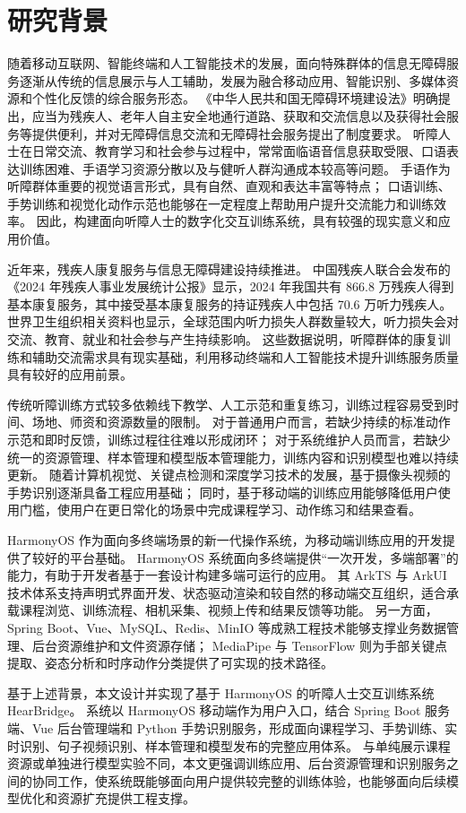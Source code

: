 
\section{研究背景}

随着移动互联网、智能终端和人工智能技术的发展，面向特殊群体的信息无障碍服务逐渐从传统的信息展示与人工辅助，发展为融合移动应用、智能识别、多媒体资源和个性化反馈的综合服务形态。
《中华人民共和国无障碍环境建设法》明确提出，应当为残疾人、老年人自主安全地通行道路、获取和交流信息以及获得社会服务等提供便利，并对无障碍信息交流和无障碍社会服务提出了制度要求\cite{accessibility-law-2023}。
听障人士在日常交流、教育学习和社会参与过程中，常常面临语音信息获取受限、口语表达训练困难、手语学习资源分散以及与健听人群沟通成本较高等问题。
手语作为听障群体重要的视觉语言形式，具有自然、直观和表达丰富等特点；
口语训练、手势训练和视觉化动作示范也能够在一定程度上帮助用户提升交流能力和训练效率。
因此，构建面向听障人士的数字化交互训练系统，具有较强的现实意义和应用价值。

近年来，残疾人康复服务与信息无障碍建设持续推进。
中国残疾人联合会发布的《2024 年残疾人事业发展统计公报》显示，2024 年我国共有 866.8 万残疾人得到基本康复服务，其中接受基本康复服务的持证残疾人中包括 70.6 万听力残疾人\cite{cdpf-statistical-communique-2024}。
世界卫生组织相关资料也显示，全球范围内听力损失人群数量较大，听力损失会对交流、教育、就业和社会参与产生持续影响\cite{who-hearing-loss-2026}。
这些数据说明，听障群体的康复训练和辅助交流需求具有现实基础，利用移动终端和人工智能技术提升训练服务质量具有较好的应用前景。

传统听障训练方式较多依赖线下教学、人工示范和重复练习，训练过程容易受到时间、场地、师资和资源数量的限制。
对于普通用户而言，若缺少持续的标准动作示范和即时反馈，训练过程往往难以形成闭环；
对于系统维护人员而言，若缺少统一的资源管理、样本管理和模型版本管理能力，训练内容和识别模型也难以持续更新。
随着计算机视觉、关键点检测和深度学习技术的发展，基于摄像头视频的手势识别逐渐具备工程应用基础；
同时，基于移动端的训练应用能够降低用户使用门槛，使用户在更日常化的场景中完成课程学习、动作练习和结果查看。

HarmonyOS 作为面向多终端场景的新一代操作系统，为移动端训练应用的开发提供了较好的平台基础。
HarmonyOS 系统面向多终端提供“一次开发，多端部署”的能力，有助于开发者基于一套设计构建多端可运行的应用\cite{harmonyos-multi-device-deployment}。
其 ArkTS 与 ArkUI 技术体系支持声明式界面开发、状态驱动渲染和较自然的移动端交互组织，适合承载课程浏览、训练流程、相机采集、视频上传和结果反馈等功能。
另一方面，Spring Boot、Vue、MySQL、Redis、MinIO 等成熟工程技术能够支撑业务数据管理、后台资源维护和文件资源存储；
MediaPipe 与 TensorFlow 则为手部关键点提取、姿态分析和时序动作分类提供了可实现的技术路径\cite{lugaresi-mediapipe-2019,zhang-mediapipe-hands-2020}。

基于上述背景，本文设计并实现了基于 HarmonyOS 的听障人士交互训练系统 HearBridge。
系统以 HarmonyOS 移动端作为用户入口，结合 Spring Boot 服务端、Vue 后台管理端和 Python 手势识别服务，形成面向课程学习、手势训练、实时识别、句子视频识别、样本管理和模型发布的完整应用体系。
与单纯展示课程资源或单独进行模型实验不同，本文更强调训练应用、后台资源管理和识别服务之间的协同工作，使系统既能够面向用户提供较完整的训练体验，也能够面向后续模型优化和资源扩充提供工程支撑。
